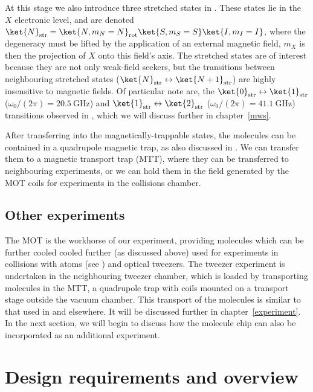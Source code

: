 At this stage we also introduce three stretched states in \CaF{}. These states
lie in the $X$ electronic level, and are denoted $\ket{N}_\text{str} = \ket{N,
m_N=N}_\text{rot}\ket{S, m_S=S}\ket{I,m_I=I}$, where the degeneracy must be
lifted by the application of an external magnetic field, $m_X$ is then the
projection of $X$ onto this field's axis. The stretched states are of interest
because they are not only weak-field seekers, but the transitions between
neighbouring stretched states
($\ket{N}_\text{str}\leftrightarrow\ket{N+1}_\text{str}$) are highly
insensitive to magnetic fields. Of particular note are, the
$\ket{0}_\text{str}\leftrightarrow\ket{1}_\text{str}$ ($\omega_0/(2\pi) =
\SI{20.5}{\giga\hertz}$) and
$\ket{1}_\text{str}\leftrightarrow\ket{2}_\text{str}$ ($\omega_0/(2\pi) =
\SI{41.1}{\giga\hertz}$) transitions observed in
, which we will discuss further in
chapter~\ref{mws}.

After transferring into the magnetically-trappable states, the molecules can be
contained in a quadrupole magnetic trap, as also discussed in
. We can transfer them to a magnetic transport
trap (MTT), where they can be transferred to neighbouring experiments, or we
can hold them in the field generated by the MOT coils for experiments in the
collisions chamber.

\subsection*{Other experiments}

The \CaF{} MOT is the workhorse of our experiment, providing molecules which
can be further cooled cooled further (as discussed above) used for experiments
in collisions with \Rb{} atoms (see ) and optical tweezers. The tweezer experiment is
undertaken in the neighbouring tweezer chamber, which is loaded by transporting
molecules in the MTT, a quadrupole trap with coils mounted on a transport stage
outside the vacuum chamber. This transport of the molecules is similar to that
used in  and elsewhere. It
will be discussed further in chapter~\ref{experiment}. In the next section, we
will begin to discuss how the molecule chip can also be incorporated as an
additional experiment.


\section{Design requirements and overview}

